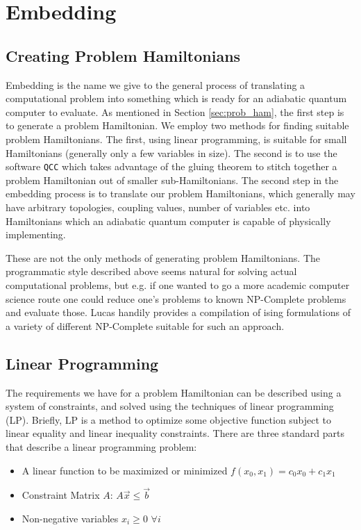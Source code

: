 \chapter{Embedding}
\label{chap:embed}
\section{Creating Problem Hamiltonians}
Embedding is the name we give to the general process of translating a computational problem into something which is ready for an adiabatic quantum computer to evaluate.  As mentioned in Section \ref{sec:prob_ham}, the first step is to generate a problem Hamiltonian.  We employ two methods for finding suitable problem Hamiltonians.  The first, using linear programming, is suitable for small Hamiltonians (generally only a few variables in size).  The second is to use the software \texttt{QCC} which takes advantage of the gluing theorem to stitch together a problem Hamiltonian out of smaller sub-Hamiltonians.
The second step in the embedding process is to translate our problem Hamiltonians, which generally may have arbitrary topologies, coupling values, number of variables etc. into Hamiltonians which an adiabatic quantum computer is capable of physically implementing.

These are not the only methods of generating problem Hamiltonians.  The programmatic style described above seems natural for solving actual computational problems, but e.g. if one wanted to go a more academic computer science route one could reduce one's problems to known NP-Complete problems and evaluate those.  Lucas \cite{lucas} handily provides a compilation of ising formulations of a variety of different NP-Complete suitable for such an approach.

\section{Linear Programming}
The requirements we have for a problem Hamiltonian can be described using a system of constraints, and solved using the techniques of linear programming (LP).
Briefly, LP is a method to optimize some objective function subject to linear equality and linear inequality constraints.  There are three standard parts that describe a linear programming problem:

\begin{itemize}
	\item A linear function to be maximized or minimized
		\subitem $f(x_0,x_1) = c_0x_0 + c_1x_1$
	\item Constraint Matrix $A$:
		\subitem $A\vec{x} \le \vec{b} $
	\item Non-negative variables
		\subitem $x_i \ge 0$ $\forall i$
\end{itemize}


